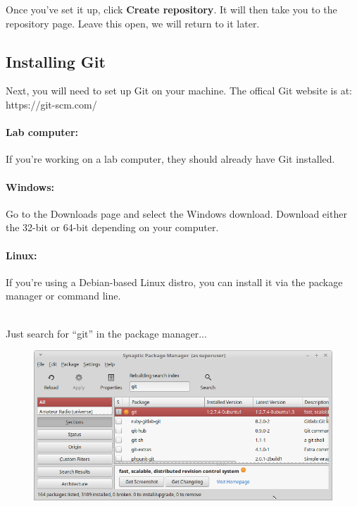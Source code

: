 \documentclass[a4paper,12pt,oneside]{book}
\begin{document}
                Once you've set it up, click \textbf{Create repository}.
                It will then take you to the repository page. Leave this
                open, we will return to it later.

            \newpage
            
        \subsection{Installing Git}

            Next, you will need to set up Git on your machine. The
            offical Git website is at: https://git-scm.com/

        \paragraph{Lab computer:}
            If you're working on a lab computer, they should already have Git installed.

        \paragraph{Windows:}
            Go to the Downloads page and select the Windows download.
            Download either the 32-bit or 64-bit depending on
            your computer.

        \paragraph{Linux:}
            If you're using a Debian-based Linux distro, you can install it
            via the package manager or command line.

            ~\\
            Just search for ``git'' in the package manager...

                \begin{figure}[h]
                    \centering
                    \includegraphics[width=14cm]{images/git-synaptic.png}
                \end{figure}
\end{document}

